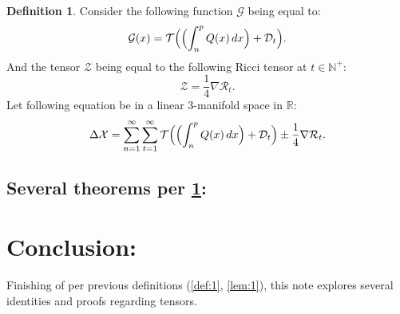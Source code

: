 \documentclass[10pt]{article}
\theoremstyle{plain}
\theoremstyle{definition}
\newtheorem{definition}[theorem]{Definition}
\theoremstyle{remark}
\begin{document}
\begin{definition}
\label{def:eq-tensor}
Consider the following function $\mathcal{G}$ being equal to:
\begin{equation}
	\mathcal{G}(x) = {\mathcal{T}}\Bigl(\Bigl( \int_{n}^{p} Q(x) \, dx \Bigr) + \mathcal{D}_t\Bigr).
\end{equation}
And the tensor $\mathcal{Z}$ being equal to the following Ricci tensor at $t \in \mathbb{N}^{+}$:
\begin{equation}
	\mathcal{Z} = \frac{1}{4} \nabla \mathcal{R}_{t}.
\end{equation}
Let following equation be in a linear 3-manifold space in $\mathbb{R}$:
\begin{equation}
	\Delta \mathcal{X} = \sum_{n=1}^{\infty} \sum_{t=1}^{\infty} {\mathcal{T}}\Bigl(\Bigl( \int_{n}^{p} Q(x) \, dx \Bigr) + \mathcal{D}_t\Bigr) \pm \frac{1}{4} \nabla \mathcal{R}_{t}.
\end{equation}
\end{definition}

\subsection{Several theorems per \ref{def:eq-tensor}:}

\section{Conclusion:}
Finishing of per previous definitions (\ref{def:1}, \ref{lem:1}), this note explores several identities and proofs regarding tensors.

\nocite{*}



\end{document}
